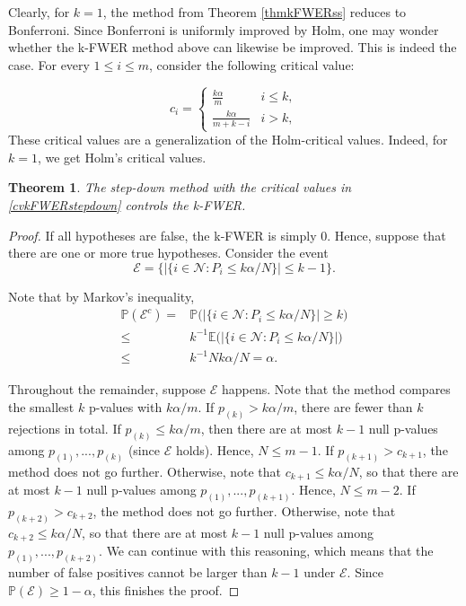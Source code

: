 \documentclass[11pt]{article}
\theoremstyle{plain}
\newtheorem{theorem}{Theorem}[section]
\theoremstyle{definition}
\newcommand{\N}{\mathcal{N}}
\newcommand{\E}{\mathcal{E}}
\newcommand{\pr}{\mathbb{P}}
\newcommand{\citp}{\citep}
\begin{document}
Clearly, for $k=1$, the method from Theorem \ref{thmkFWERss} reduces to Bonferroni. Since Bonferroni is uniformly improved by Holm, one may wonder whether  the k-FWER method above can likewise be improved. This is indeed the case. For every $1\leq i \leq m$, consider the following critical value:

\begin{equation} \label{cvkFWERstepdown}
c_i=
 \begin{cases}
\frac{k\alpha}{m}& i\leq k, \\
\frac{k\alpha}{m+k-i} & i>k,
\end{cases}
\end{equation}
These critical values are a generalization of the Holm-critical values. Indeed, for $k=1$, we get  Holm's critical values. 


\begin{theorem} \label{thmkFWERstepdown}
The step-down method with the critical values in \eqref{cvkFWERstepdown} controls the k-FWER.%
\end{theorem}
\begin{proof}
If all hypotheses are false, the k-FWER is simply 0. Hence, suppose that there are one or more true hypotheses.
Consider the event
$$\E = \Big\{  |\{i\in \N: P_i\leq k\alpha/N\}|\leq k-1   \Big\}.$$ 


Note that by Markov's inequality,
\begin{align*}
\pr(\E^c)  = &  \pr\big(|\{i\in \N: P_i\leq k\alpha/N\}| \geq k\big) \\
\leq & k^{-1} \mathbb{E}\big(|\{i\in \N: P_i\leq k\alpha/N\}|\big)\\
\leq & k^{-1}N k\alpha/N =\alpha.
\end{align*}




Throughout the remainder, suppose $\E$ happens.
Note that the method compares the smallest $k$ p-values with $k\alpha/m$. 
If $p_{(k)}>k\alpha/m$, there are fewer than $k$ rejections in total.
If $p_{(k)} \leq k\alpha/m$,  then there are at most $k-1$ null p-values among $p_{(1)},...,p_{(k)}$ (since $\E$ holds). Hence, $N\leq m-1$. 
If $p_{(k+1)}>c_{k+1}$, the method does not go further.
Otherwise, note that $c_{k+1}\leq k\alpha/N$, so that there are at most $k-1$ null p-values among $p_{(1)},...,p_{(k+1)}$. Hence, $N\leq m-2$.
If $p_{(k+2)}>c_{k+2}$, the method does not go further.
Otherwise, note that $c_{k+2}\leq k\alpha/N$, so that there are at most $k-1$ null p-values among $p_{(1)},...,p_{(k+2)}$. 
We can continue with this reasoning, which means  that the number of false positives cannot be larger than $k-1$ under $\E$. Since $\pr(\E)\geq 1-\alpha$, this finishes the proof.


\end{proof}
\end{document}
